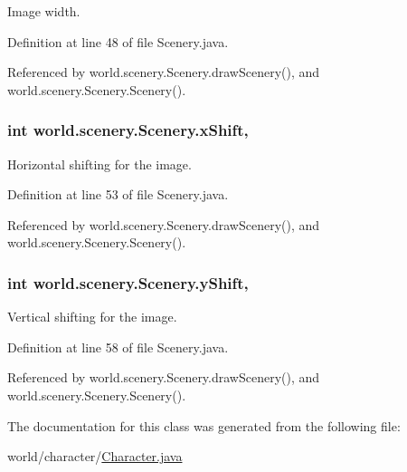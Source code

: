 Image width. 



Definition at line 48 of file Scenery.\-java.



Referenced by world.\-scenery.\-Scenery.\-draw\-Scenery(), and world.\-scenery.\-Scenery.\-Scenery().

\hypertarget{a00024_a0999f105f7630fd67fd9d440da6983aa}{
\subsubsection[{x\-Shift}]{\setlength{\rightskip}{0pt plus 5cm}int world.\-scenery.\-Scenery.\-x\-Shift\hspace{0.3cm}{\ttfamily [protected]}, {\ttfamily [inherited]}}}\label{a00024_a0999f105f7630fd67fd9d440da6983aa}


Horizontal shifting for the image. 



Definition at line 53 of file Scenery.\-java.



Referenced by world.\-scenery.\-Scenery.\-draw\-Scenery(), and world.\-scenery.\-Scenery.\-Scenery().

\hypertarget{a00024_ac9ca2c17cf6920deffe490c013b0e638}{
\subsubsection[{y\-Shift}]{\setlength{\rightskip}{0pt plus 5cm}int world.\-scenery.\-Scenery.\-y\-Shift\hspace{0.3cm}{\ttfamily [protected]}, {\ttfamily [inherited]}}}\label{a00024_ac9ca2c17cf6920deffe490c013b0e638}


Vertical shifting for the image. 



Definition at line 58 of file Scenery.\-java.



Referenced by world.\-scenery.\-Scenery.\-draw\-Scenery(), and world.\-scenery.\-Scenery.\-Scenery().



The documentation for this class was generated from the following file\-:\begin{DoxyCompactItemize}
\item 
world/character/\hyperlink{a00058}{Character.\-java}\end{DoxyCompactItemize}

